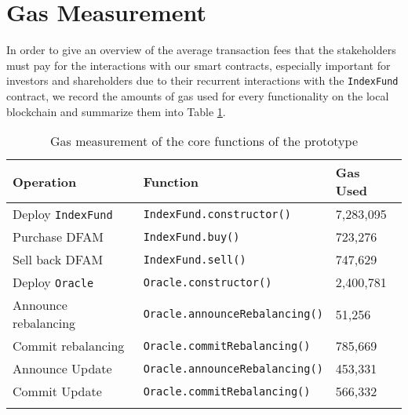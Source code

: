 \section{Gas Measurement} \label{sec:gas}

In order to give an overview of the average transaction fees that the stakeholders must pay for the interactions with our smart contracts, especially important for investors and shareholders due to their recurrent interactions with the \texttt{IndexFund} contract, we record the amounts of gas used for every functionality on the local blockchain and summarize them into Table \ref{tab:gas}.

\begin{longtable}{p{}p{}p{}}
        \toprule 
        \textbf{Operation} & \textbf{Function} & \textbf{Gas Used}\\
        \midrule
        Deploy \texttt{IndexFund} & \texttt{IndexFund.constructor()} & 7,283,095 \\
        Purchase DFAM & \texttt{IndexFund.buy()} & 723,276 \\
        Sell back DFAM & \texttt{IndexFund.sell()} & 747,629 \\
        Deploy \texttt{Oracle} & \texttt{Oracle.constructor()} & 2,400,781 \\
        Announce rebalancing & \texttt{Oracle.announceRebalancing()} & 51,256 \\
        Commit rebalancing & \texttt{Oracle.commitRebalancing()} & 785,669 \\
        Announce Update & \texttt{Oracle.announceRebalancing()} & 453,331 \\
        Commit Update & \texttt{Oracle.commitRebalancing()} & 566,332 \\
        \bottomrule
        \caption{\label{tab:gas} Gas measurement of the core functions of the prototype}
\end{longtable}




